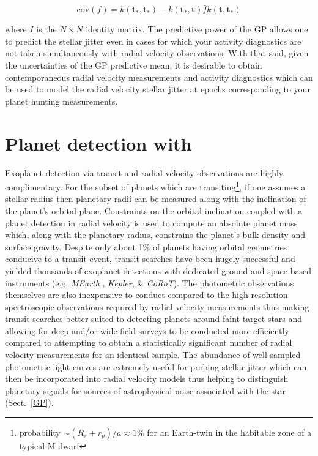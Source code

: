 \begin{equation}
\mathrm{cov}(f) = k(\mathbf{t_*}, \mathbf{t_*}) - k(\mathbf{t_*}, \mathbf{t}) 
\bar{f} k(\mathbf{t}, \mathbf{t_*}) 
\end{equation}

\noindent where $I$ is the $N \times N$ identity matrix. The predictive power 
of the GP allows one to predict the stellar jitter even in cases for which 
your activity diagnostics are not taken simultaneously with radial velocity 
observations. With that said, given the uncertainties of the GP predictive 
mean, it is desirable to obtain contemporaneous radial velocity measurements 
and activity diagnostics which can be used to model the radial velocity stellar 
jitter at epochs corresponding to your planet hunting measurements.

\section{Planet detection with \spirou{}}
Exoplanet detection via transit and radial velocity observations are highly 
complimentary. For the subset of planets which are 
transiting\footnote{probability $\sim (R_s+r_p)/a \approx 1$\% for an 
Earth-twin in the habitable zone of a typical M-dwarf}, if one assumes a 
stellar radius then planetary radii can be measured along 
with the inclination of the planet's orbital plane. 
Constraints on the orbital inclination coupled with a planet detection in 
radial velocity is used to compute an 
absolute planet mass which, along with the planetary radius, constrains 
the planet's bulk density and surface gravity. Despite only 
about 1\% of planets having orbital geometries conducive to a transit event, 
transit searches have been hugely successful and yielded thousands of 
exoplanet detections with dedicated ground and 
space-based instruments (e.g. \emph{MEarth} \citealt{irwin15}, \emph{Kepler}, 
\& \emph{CoRoT}). The photometric observations themselves are also 
inexpensive to conduct compared to the high-resolution spectroscopic 
observations required by radial velocity measurements thus making transit 
searches better suited to detecting planets around faint target stars and 
allowing for deep and/or wide-field surveys to be conducted more efficiently 
compared to attempting to obtain a statistically significant number of radial 
velocity measurements for an identical sample. The abundance of well-sampled 
photometric light curves are extremely useful for probing stellar jitter which 
can then be incorporated into radial velocity models thus helping to 
distinguish planetary signals for sources of astrophysical noise associated 
with the star (Sect.~\ref{GP}).

